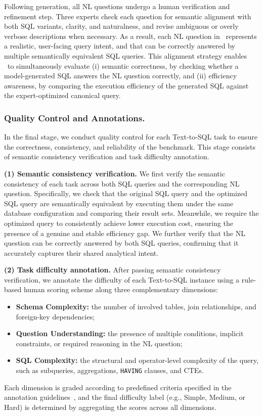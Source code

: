 Following generation, all NL questions undergo a human verification and refinement step.
Three experts check each question for semantic alignment with both SQL variants, clarity, and naturalness, and revise ambiguous or overly verbose descriptions when necessary.
As a result, each NL question in \benchmark\ represents a realistic, user-facing query intent, and that can be correctly answered by multiple semantically equivalent SQL queries.
This alignment strategy enables \benchmark\ to simultaneously evaluate (i) semantic correctness, by checking whether a model-generated SQL answers the NL question correctly, and (ii) efficiency awareness, by comparing the execution efficiency of the generated SQL against the expert-optimized canonical query.

\subsubsection{Quality Control and Annotations.}
\label{subsubsec:quality control}
In the final stage, we conduct quality control for each Text-to-SQL task to ensure the correctness, consistency, and reliability of the benchmark.
This stage consists of semantic consistency verification and task difficulty annotation.

\textbf{(1) Semantic consistency verification.}
We first verify the semantic consistency of each task across both SQL queries and the corresponding NL question.
Specifically, we check that the original SQL query and the optimized SQL query are semantically equivalent by executing them under the same database configuration and comparing their result sets.
Meanwhile, we require the optimized query to consistently achieve lower execution cost, ensuring the presence of a genuine and stable efficiency gap.
We further verify that the NL question can be correctly answered by both SQL queries, confirming that it accurately captures their shared analytical intent.

\textbf{(2) Task difficulty annotation.}
After passing semantic consistency verification, we annotate the difficulty of each Text-to-SQL instance using a rule-based human scoring scheme along three complementary dimensions:
\begin{itemize}[leftmargin=10pt]
	\item \textbf{Schema Complexity:} the number of involved tables, join relationships, and foreign-key dependencies;
	\item \textbf{Question Understanding:} the presence of multiple conditions, implicit constraints, or required reasoning in the NL question;
	\item \textbf{SQL Complexity:} the structural and operator-level complexity of the query, such as subqueries, aggregations, \texttt{HAVING} clauses, and CTEs.
\end{itemize}
Each dimension is graded according to predefined criteria specified in the annotation guidelines~\cite{eesqlbench_guidelines}, and the final difficulty label (e.g., Simple, Medium, or Hard) is determined by aggregating the scores across all dimensions.

